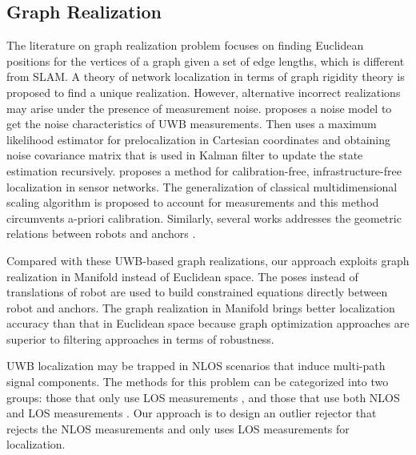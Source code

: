 \documentclass[journal]{IEEEtran}
\begin{document}
\subsection{Graph Realization}

The literature on graph realization problem focuses on finding Euclidean positions for the vertices of a graph given a set of edge lengths, which is different from SLAM. A theory of network localization in terms of graph rigidity theory is proposed \cite{Aspnes:2006up} to find a unique realization. However, alternative incorrect realizations may arise under the presence of measurement noise. \cite{XingboWang:2012kw} proposes a noise model to get the noise characteristics of UWB measurements. Then uses a maximum likelihood estimator for  prelocalization in Cartesian coordinates and obtaining noise covariance matrix that is used in Kalman filter to update the state estimation recursively.  \cite{DiFranco:2017ib} proposes a method for calibration-free, infrastructure-free localization in sensor networks. The generalization of classical multidimensional scaling algorithm is proposed to account for measurements and this method circumvents a-priori calibration. Similarly, several works addresses the geometric relations between robots and anchors \cite{Diao:2014uh, Khan:2009ui}. 

Compared with these UWB-based graph realizations, our approach exploits graph realization in Manifold instead of Euclidean space. The poses instead of translations of robot are used to build constrained equations directly between robot and anchors. The graph realization in Manifold
brings better localization accuracy than that in Euclidean space because graph optimization approaches are superior to filtering approaches in terms of robustness.

UWB localization may be trapped in NLOS scenarios that induce multi-path signal components. The methods for this problem can be categorized into two groups: those that only use LOS measurements \cite{Chan:2006id,LiCong:2005jf}, and those that use both NLOS and LOS measurements \cite{Anonymous:juzQYOCo, Venkatraman:2004gc}. Our approach is to design an outlier rejector that rejects the NLOS measurements and only uses LOS measurements for localization.
\end{document}
